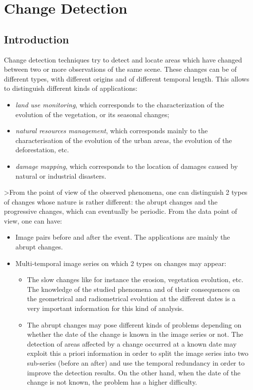 \chapter{Change Detection}
\section{Introduction}
Change detection techniques try to detect and locate areas which have
changed between two or more observations of the same scene. These
changes can be of different types, with different origins and of
different temporal length. This allows to distinguish different kinds
of applications:
\begin{itemize}
\item \emph{land use monitoring}, which corresponds to the
  characterization of the evolution of the vegetation, or its seasonal
  changes;
\item \emph{natural resources management}, which corresponds mainly
  to the characterisation of the evolution of the urban areas, the
  evolution of the deforestation, etc.
\item \emph{damage mapping}, which corresponds to the location of
  damages caused by natural or industrial disasters.
\end{itemize}

>From the point of view of the observed phenomena, one can distinguish
2 types of changes whose nature is rather different: the abrupt
changes and the progressive changes, which can eventually be
periodic. From the data point of view, one can have:

       \begin{itemize}
       \item Image pairs before and after the event. The applications
       are mainly the abrupt changes.

	 \item Multi-temporal image series on which 2 types on changes
	 may appear:
	 \begin{itemize}
	   \item The slow changes like for instance the erosion,
	   vegetation evolution, etc. The knowledge of the studied
	   phenomena and of their consequences on the geometrical
	   and radiometrical evolution at the different dates is a
	   very important information for this kind of analysis.

	     \item The abrupt changes may pose different kinds of
	     problems depending on whether the date of the change is
	     known in the image series or not. The detection of areas
	     affected by a change occurred at a known date may exploit
	     this a priori information in order to split the image
	     series into two sub-series (before an after) and use the
	     temporal redundancy in order to improve the detection
	     results. On the other hand, when the date of the change
	     is not known, the problem has a higher difficulty.

	 \end{itemize}
	 
       \end{itemize}

